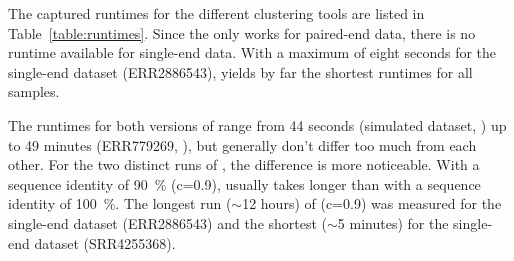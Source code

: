 \documentclass[12pt,a4paper,english]{article}
\begin{document}
        The captured runtimes for the different clustering tools are listed in Table~\ref{table:runtimes}. Since the \orp only works for paired-end data, there is no runtime available for single-end data. With a maximum of eight seconds for the single-end \celegans dataset (ERR2886543), \linclust yields by far the shortest runtimes for all samples.

		The runtimes for both versions of \mclust range from 44 seconds (simulated dataset, \mclusttwo) up to 49 minutes (ERR779269, \mclust), but generally don't differ too much from each other.
		For the two distinct runs of \cdhit, the difference is more noticeable. With a sequence identity of 90~\% (c=0.9), \cdhit usually takes longer than with a sequence identity of 100~\%. The longest run ($\sim$12 hours) of \cdhit (c=0.9) was measured for the single-end \celegans dataset (ERR2886543) and the shortest ($\sim$5 minutes) for the single-end \ecoli dataset (SRR4255368).
\end{document}
